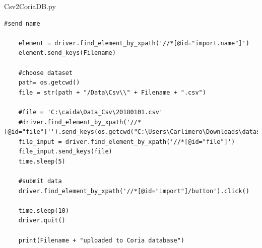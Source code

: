 \documentclass[conference, 11pt]{IEEEtran}
\begin{document}
\begin{appendices}
\begin{section}{Csv2CoriaDB.py}
\begin{lstlisting}[float=*]
	#send name
	
	element = driver.find_element_by_xpath('//*[@id="import.name"]')
	element.send_keys(Filename)

	#choose dataset
	path= os.getcwd()
	file = str(path + "/Data\Csv\\" + Filename + ".csv")

	#file = 'C:\caida\Data_Csv\20180101.csv'
	#driver.find_element_by_xpath('//*[@id="file"]'').send_keys(os.getcwd("C:\Users\Carlimero\Downloads\datastructrue.txt")')
	file_input = driver.find_element_by_xpath('//*[@id="file"]')
	file_input.send_keys(file)
	time.sleep(5)

	#submit data
	driver.find_element_by_xpath('//*[@id="import"]/button').click()

	time.sleep(10)
	driver.quit()

	print(Filename + "uploaded to Coria database")
\end{lstlisting}
\end{section}

\end{appendices}
\end{document}
